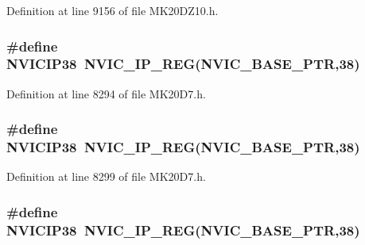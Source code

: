 Definition at line 9156 of file M\+K20\+D\+Z10.\+h.

\subsubsection[{\texorpdfstring{N\+V\+I\+C\+I\+P38}{NVICIP38}}]{\setlength{\rightskip}{0pt plus 5cm}\#define N\+V\+I\+C\+I\+P38~{\bf N\+V\+I\+C\+\_\+\+I\+P\+\_\+\+R\+EG}({\bf N\+V\+I\+C\+\_\+\+B\+A\+S\+E\+\_\+\+P\+TR},38)}\hypertarget{group___n_v_i_c___register___accessor___macros_gab9920f2709076ef1981d9b027c1e6c1e}{}\label{group___n_v_i_c___register___accessor___macros_gab9920f2709076ef1981d9b027c1e6c1e}


Definition at line 8294 of file M\+K20\+D7.\+h.

\subsubsection[{\texorpdfstring{N\+V\+I\+C\+I\+P38}{NVICIP38}}]{\setlength{\rightskip}{0pt plus 5cm}\#define N\+V\+I\+C\+I\+P38~{\bf N\+V\+I\+C\+\_\+\+I\+P\+\_\+\+R\+EG}({\bf N\+V\+I\+C\+\_\+\+B\+A\+S\+E\+\_\+\+P\+TR},38)}\hypertarget{group___n_v_i_c___register___accessor___macros_gab9920f2709076ef1981d9b027c1e6c1e}{}\label{group___n_v_i_c___register___accessor___macros_gab9920f2709076ef1981d9b027c1e6c1e}


Definition at line 8299 of file M\+K20\+D7.\+h.

\subsubsection[{\texorpdfstring{N\+V\+I\+C\+I\+P38}{NVICIP38}}]{\setlength{\rightskip}{0pt plus 5cm}\#define N\+V\+I\+C\+I\+P38~{\bf N\+V\+I\+C\+\_\+\+I\+P\+\_\+\+R\+EG}({\bf N\+V\+I\+C\+\_\+\+B\+A\+S\+E\+\_\+\+P\+TR},38)}\hypertarget{group___n_v_i_c___register___accessor___macros_gab9920f2709076ef1981d9b027c1e6c1e}{}\label{group___n_v_i_c___register___accessor___macros_gab9920f2709076ef1981d9b027c1e6c1e}


